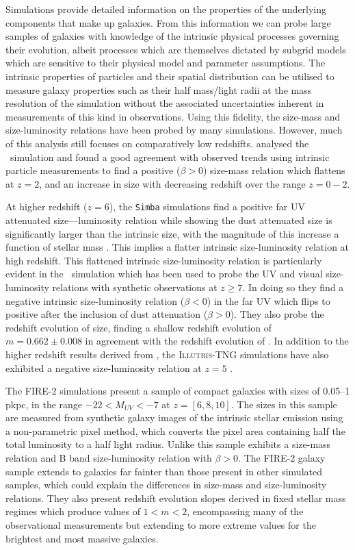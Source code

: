 Simulations provide detailed information on the properties of the underlying components that make up galaxies. From this information we can probe large samples of galaxies with knowledge of the intrinsic physical processes governing their evolution, albeit processes which are themselves dictated by subgrid models which are sensitive to their physical model and parameter assumptions. The intrinsic properties of particles and their spatial distribution can be utilised to measure galaxy properties such as their half mass/light radii at the mass resolution of the simulation without the associated uncertainties inherent in measurements of this kind in observations. Using this fidelity, the size-mass and size-luminosity relations have been probed by many simulations. However, much of this analysis still focuses on comparatively low redshifts. \cite{Furlong_2017} analysed the \eagle\ simulation and found a good agreement with observed trends using intrinsic particle measurements to find a positive ($\beta>0$) size-mass relation which flattens at $z=2$, and an increase in size with decreasing redshift over the range $z=0-2$.

At higher redshift ($z=6$), the \texttt{Simba} simulations \citep{Simba2019} find a positive far UV attenuated size—luminosity relation while showing the dust attenuated size is significantly larger than the intrinsic size, with the magnitude of this increase a function of stellar mass \citep{Wu2020}.  This implies a flatter intrinsic size-luminosity relation at high redshift. This flattened intrinsic size-luminosity relation is particularly evident in the \bluetides\ simulation \citep{Feng2016,Marshall21} which has been used to probe the UV and visual size-luminosity relations with synthetic observations at $z\geq7$. In doing so they find a negative intrinsic size-luminosity relation ($\beta<0$) in the far UV which flips to positive after the inclusion of dust attenuation ($\beta>0$). They also probe the redshift evolution of size, finding a shallow redshift evolution of $m=0.662\pm0.008$ in agreement with the redshift evolution of \cite{Holwerda_2015}. In addition to the higher redshift results derived from \bluetides, the \textsc{Illutris-TNG} simulations have also exhibited a negative size-luminosity relation at $z=5$ \citep{Popping2021}.

The FIRE-2 simulations \citep{Ma_18_size} present a sample of compact galaxies with sizes of 0.05–1 pkpc, in the range $-22<M_{UV}<-7$ at $z=[6,8,10]$. The sizes in this sample are measured from synthetic galaxy images of the intrinsic stellar emission using a non-parametric pixel method, which converts the pixel area containing half the total luminosity to a half light radius. Unlike \cite{Marshall21} this sample exhibits a size-mass relation and B band size-luminosity relation with $\beta>0$. The FIRE-2 galaxy sample extends to galaxies far fainter than those present in other simulated samples, which could explain the differences in size-mass and size-luminosity relations. They also present redshift evolution slopes derived in fixed stellar mass regimes which produce values of $1<m<2$, encompassing many of the observational measurements but extending to more extreme values for the brightest and most massive galaxies.

